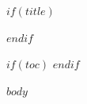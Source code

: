 \documentclass[11pt,oneside]{book}
\begin{document}
$if(title)$
\maketitle
$endif$

$if(toc)$
\tableofcontents
\newpage
$endif$

$body$
\end{document}
